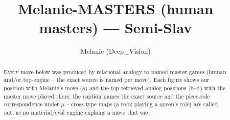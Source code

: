 \documentclass[11pt]{article}
\title{Melanie-MASTERS (human masters) — Semi-Slav}
\author{Melanie (Deep\_Vision)}
\date{}
\begin{document}
\maketitle

\begin{abstract}Every move below was produced by relational analogy to named master games (human and/or top-engine -- the exact source is named per move). Each figure shows our position with Melanie's move (a) and the top retrieved analog positions (b--d) with the master move played there; the caption names the exact source and the piece-role correspondence under $\mu$ -- cross-type maps (a rook playing a queen's role) are called out, as no material/eval engine explains a move that way.\end{abstract}

\begin{figure}[p]\centering
\begin{subfigure}{0.46\textwidth}\centering
\resizebox{\linewidth}{!}{%
\newchessgame
\chessboard[
  setfen={r1bqkb1r/pp1n1ppp/2p1pn2/8/2pP4/2NBPN2/PP3PPP/R1BQK2R w KQkq - 0 7},
  showmover=false,
  pgfstyle=straightmove, color=movearrow, markmove={e1-g1}
]}
\caption{}
\end{subfigure}\hfill
\begin{subfigure}{0.46\textwidth}\centering
\resizebox{\linewidth}{!}{%
\newchessgame
\chessboard[
  setfen={r2qk2r/1p1nbppp/p2p1n2/2pP4/P1P5/2NN1P2/1P4PP/R1BQK2R w KQkq - 1 13},
  showmover=false,
  pgfstyle=straightmove, color=movearrow, markmove={e1-g1}
]}
\caption{}
\end{subfigure}
\\[4pt]
\begin{subfigure}{0.46\textwidth}\centering
\resizebox{\linewidth}{!}{%
\newchessgame
\chessboard[
  setfen={rn1q1rk1/pp1b1pb1/3p1npp/2pP4/2P5/2NB1N1P/PP3PP1/R1BQK2R w KQ - 1 12},
  showmover=false,
  pgfstyle=straightmove, color=movearrow, markmove={e1-g1}
]}
\caption{}
\end{subfigure}\hfill
\begin{subfigure}{0.46\textwidth}\centering
\resizebox{\linewidth}{!}{%
\newchessgame
\chessboard[
  setfen={1rbqk2r/3nbppp/3p1n2/1p1Pp3/8/2N3P1/1PP1NPBP/R1BQK2R w KQk - 0 12},
  showmover=false,
  pgfstyle=straightmove, color=movearrow, markmove={e1-g1}
]}
\caption{}
\end{subfigure}

\end{figure}
\end{document}
